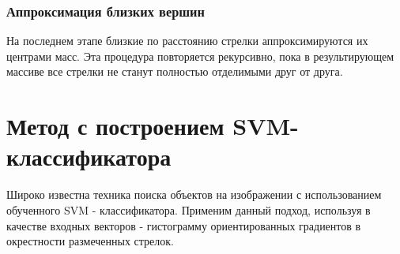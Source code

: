 \subsubsection{Аппроксимация близких вершин}
\label{approxi}
На последнем этапе близкие по расстоянию стрелки аппроксимируются их центрами масс.
Эта процедура повторяется рекурсивно, пока в результирующем массиве все стрелки не станут полностью отделимыми друг от друга.

\newpage			
\section{Метод с построением SVM-классификатора}
Широко известна техника поиска объектов на изображении с использованием обученного SVM\cite{b:SVM} - классификатора. Применим данный подход, используя в качестве входных векторов - гистограмму ориентированных градиентов\cite{b:HOG} в окрестности размеченных стрелок. 
